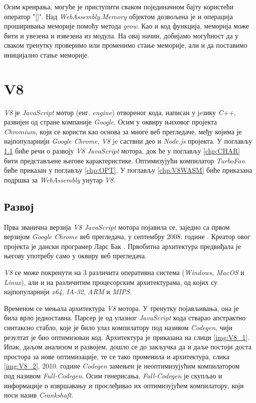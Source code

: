 \documentclass[12pt,oneside]{memoir}
\begin{document}
Осим креирања, могуће је приступити сваком појединачном бајту користећи оператор "[]". Над \textit{WebAssembly.Memory}
објектом дозвољена је и операција проширивања меморије помоћу метода \textit{grow}. Као и код функција, меморија може бити и увезена и извезена из модула.
На овај начин, добијамо могућност да у сваком тренутку проверимо или променимо стање меморије, али и да поставимо иницијално стање меморије.

\chapter{V8}

\textit{V8} је \textit{JavaScript} мотор (енг. \textit{engine}) отвореног кода, написан у jeзику \textit{C++},
развијен од стране компаније \textit{Google}. Осим у оквиру њиховог пројекта \textit{Chromium}, који се користи као основа за многе веб прегледаче,
међу којима је најпопуларнији \textit{Google Chrome}, \textit{V8} je саствни део и \textit{Node.js} пројекта. У поглављу \ref{chp:DEV} биће речи о развоју
\textit{V8 JavaScript} мотора, док ће у поглављу \ref{chp:CHAR} бити представљене његове карактеристике. Оптимизујући компилатор \textit{TurboFan}
биће приказан у поглављу \ref{chp:OPT}. У поглављу \ref{chp:V8WASM} биће приказана подршка за \textit{WebAssembly} унутар \textit{V8}.

\section{Развој} \label{chp:DEV}

Прва званична верзија \textit{V8 JavaScript} мотора појавила се, заједно са првом верзијом \textit{Google Chrome} веб прегледача, у септембру 2008. године \cite{V8SP}. Креатор
овог пројекта је дански програмер Ларс Бак \cite{V8SP}. Првобитна архитектура предвиђала је његову употребу само у оквиру веб прегледача.

\textit{V8} се може покренути на 3 различита оперативна система (\textit{Windows}, \textit{MacOS} и \textit{Linux}), али и на различитим процесорским архитектурама, од којих
су најпопуларнији \textit{x64}, \textit{IA-32}, \textit{ARM} и \textit{MIPS}.

Временом се мењала архитектура \textit{V8} мотора. У тренутку појављивања, она је била врло једноставна. Парсер је од улазног \textit{JavaScript} кода стварао апстрактно
синтаксно стабло, које је било улаз компилатору под називом \textit{Codegen}, чији резултат је био оптимизован код. Архитектура је приказана на слици \ref{img:V8_1}.
Ипак, даљом анализом и развојем, дошло се до закључка да и даље постоји доста простора за нове оптимизације, те се тако променила и архитектура, слика \ref{img:V8_2}.
2010. године \textit{Codegen} замењен је неоптимизујућим компилатором под називом \textit{Full-Codegen}. Осим генерисања, \textit{Full-Codegen} је скупљао и информације о извршавању и
прослеђивао их оптимизујућем компилатору, који носи назив \textit{Crankshaft}.
\end{document}
